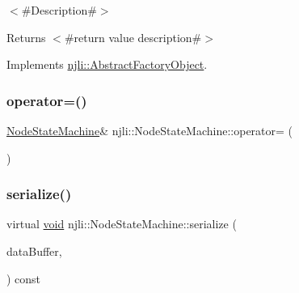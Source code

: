 $<$\#\+Description\#$>$

\begin{DoxyReturn}{Returns}
$<$\#return value description\#$>$ 
\end{DoxyReturn}


Implements \mbox{\hyperlink{classnjli_1_1_abstract_factory_object_a838f4fa7e65cace6098aab5222892942}{njli\+::\+Abstract\+Factory\+Object}}.

\mbox{\label{classnjli_1_1_node_state_machine_a8471dc3a24a5ef783e95243472e57c44}} 
\subsubsection{\texorpdfstring{operator=()}{operator=()}}
{\footnotesize\ttfamily \mbox{\hyperlink{classnjli_1_1_node_state_machine}{Node\+State\+Machine}}\& njli\+::\+Node\+State\+Machine\+::operator= (\begin{DoxyParamCaption}\item[{const \mbox{\hyperlink{classnjli_1_1_node_state_machine}{Node\+State\+Machine}} \&}]{ }\end{DoxyParamCaption})\hspace{0.3cm}{\ttfamily [protected]}}

\mbox{\label{classnjli_1_1_node_state_machine_a3e6ef26c17f22a3f7c4e03fc651f82ad}} 
\subsubsection{\texorpdfstring{serialize()}{serialize()}}
{\footnotesize\ttfamily virtual \mbox{\hyperlink{_thread_8h_af1e856da2e658414cb2456cb6f7ebc66}{void}} njli\+::\+Node\+State\+Machine\+::serialize (\begin{DoxyParamCaption}\item[{\mbox{\hyperlink{_thread_8h_af1e856da2e658414cb2456cb6f7ebc66}{void}} $\ast$}]{data\+Buffer,  }\item[{bt\+Serializer $\ast$}]{ }\end{DoxyParamCaption}) const\hspace{0.3cm}{\ttfamily [virtual]}}



